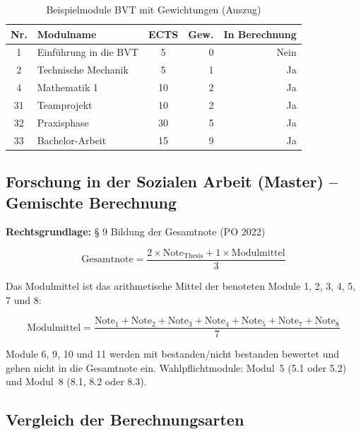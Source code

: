 \documentclass[12pt,a4paper,ngerman]{article}
\begin{document}
\begin{table}[H]
\centering
\caption{Beispielmodule BVT mit Gewichtungen (Auszug)}
\begin{tabular}{clcrr}
\toprule
\textbf{Nr.} & \textbf{Modulname} & \textbf{ECTS} & \textbf{Gew.} & \textbf{In Berechnung} \\
\midrule
1  & Einführung in die BVT     & 5  & 0 & Nein \\
2  & Technische Mechanik       & 5  & 1 & Ja \\
4  & Mathematik 1              & 10 & 2 & Ja \\
31 & Teamprojekt               & 10 & 2 & Ja \\
32 & Praxisphase               & 30 & 5 & Ja \\
33 & Bachelor-Arbeit           & 15 & 9 & Ja \\
\bottomrule
\end{tabular}
\end{table}

\subsection{Forschung in der Sozialen Arbeit (Master) -- Gemischte Berechnung}

\textbf{Rechtsgrundlage:} § 9 Bildung der Gesamtnote (PO 2022)

\[
\text{Gesamtnote} = \frac{2 \times \text{Note}_{\text{Thesis}} + 1 \times \text{Modulmittel}}{3}
\]

Das Modulmittel ist das arithmetische Mittel der benoteten Module 1, 2, 3, 4, 5, 7 und 8:

\[
\text{Modulmittel} = \frac{\text{Note}_1 + \text{Note}_2 + \text{Note}_3 + \text{Note}_4 + \text{Note}_5 + \text{Note}_7 + \text{Note}_8}{7}
\]

Module 6, 9, 10 und 11 werden mit \glqq bestanden/nicht bestanden\grqq{} bewertet und gehen nicht in die Gesamtnote ein. Wahlpflichtmodule: Modul~5 (5.1 oder 5.2) und Modul~8 (8.1, 8.2 oder 8.3).

\subsection{Vergleich der Berechnungsarten}
\end{document}
